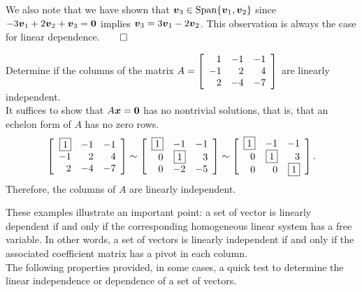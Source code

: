 \begin{Exam}
\begin{enumerate}
We also note that we have shown that $\bb v_3\in \Span\{\bb v_1, \bb v_2\}$ since $-3\bb v_1 +2 \bb v_2 + \bb v_3 = \bb 0$ implies $\bb v_3 = 3\bb v_1 - 2\bb v_2$. This observation is always the case for linear dependence.\hfill$\qedhere$
\end{enumerate}
\end{Exam}\vs

\begin{Exam} Determine if the columns of the matrix $A = \mtx{rrr}{1&-1&-1\\-1&2&4\\2&-4&-7}$ are linearly independent.\\

It suffices to show that $A\bb x = \bb 0$ has no nontrivial solutions, that is, that an echelon form of $A$ has no zero rows.
\[\mtx{rrr}{\fbox{$1$}&-1&-1\\-1&2&4\\2&-4&-7}\sim \mtx{rrr}{\fbox{$1$}&-1&-1\\0&\fbox{$1$}&3\\0&-2&-5}\sim \mtx{rrr}{\fbox{$1$}&-1&-1\\0&\fbox{$1$}&3\\0&0&\fbox{$1$}}.\] Therefore, the columns of $A$ are linearly independent.
\end{Exam}\vs

These examples illustrate an important point: a set of vector is linearly dependent if and only if the corresponding homogeneous linear system has a free variable. In other words, a set of vectors is linearly independent if and only if the associated coefficient matrix has a pivot in each column.\\

The following properties provided, in some cases, a quick test to determine the linear independence or dependence of a set of vectors.\\

